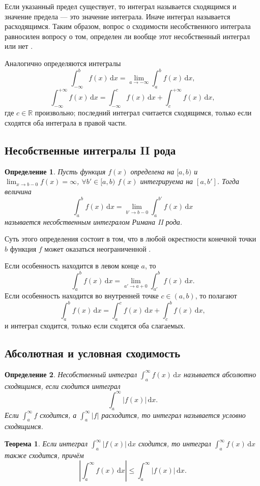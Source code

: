 \documentclass[coursework, och, times]{SCWorks1}
\newtheorem{definition}{Определение}
\newtheorem{theorem}{Теорема}
\newcommand{\R}{\mathbb{R}}
\newcommand{\dd}{\,\mathrm{d}}
\renewcommand{\le}{\leqslant}
\begin{document}
Если указанный предел существует, то интеграл называется сходящимся и значение предела --- это значение интеграла. Иначе интеграл называется расходящимся. Таким образом, вопрос о сходимости несобственного интеграла равносилен вопросу о том, определен ли вообще этот несобственный интеграл или нет \cite{zorich1}.

Аналогично определяются интегралы
\[
\int_{-\infty}^b f(x)\dd x = \lim_{a\to-\infty}\int_a^b f(x)\dd x,
\]
\[
\int_{-\infty}^{+\infty} f(x)\dd x = \int_{-\infty}^c f(x)\dd x + \int_c^{+\infty} f(x)\dd x,
\]
где $c\in\R$ произвольно; последний интеграл считается сходящимся, только если сходятся оба интеграла в правой части.

\subsection{Несобственные интегралы II рода}
\begin{definition}
Пусть функция $f(x)$ определена на $[a,b)$ и \\ $\displaystyle\lim_{x \to b -0} f(x) = \infty$, $\forall b'\in[a,b)$ $f(x)$ интегрируема на $[a,b']$. Тогда величина
\[
\int_a^b f(x)\dd x = \lim_{b' \to b-0}\int_a^{b'} f(x)\dd x
\]
называется несобственным интегралом Римана II рода.
\end{definition}

Суть этого определения состоит в том, что в любой окрестности конечной точки $b$ функция $f$ может оказаться неограниченной \cite{nikolsky}.

Если особенность находится в левом конце $a$, то
\[
\int_a^b f(x)\dd x = \lim_{a'\to a+0}\int_{a'}^b f(x)\dd x.
\]
Если особенность находится во внутренней точке $c\in(a,b)$, то полагают
\[
\int_a^b f(x)\dd x = \int_a^c f(x)\dd x + \int_c^b f(x)\dd x,
\]
и интеграл сходится, только если сходятся оба слагаемых.

\subsection{Абсолютная и условная сходимость}
\begin{definition}
Несобственный интеграл \(\int_a^\infty f(x)\dd x\) называется абсолютно сходящимся, если сходится интеграл
\[
\int_a^\infty |f(x)|\dd x.
\]
Если \(\int_a^\infty f\) сходится, а \(\int_a^\infty |f|\) расходится, то интеграл называется условно сходящимся.
\end{definition}

\begin{theorem}
Если интеграл \(\int_a^\infty |f(x)|\dd x\) сходится, то интеграл \(\int_a^\infty f(x)\dd x\) также сходится, причём
\[
\left|\int_a^\infty f(x)\dd x\right|\le \int_a^\infty |f(x)|\dd x.
\]
\end{theorem}
\end{document}

